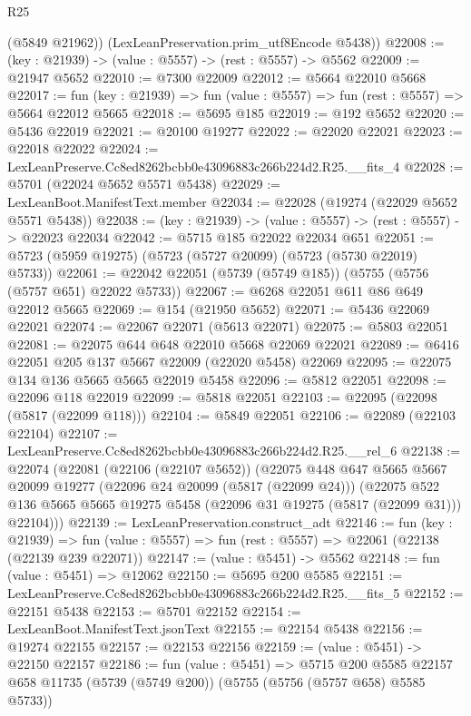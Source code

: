 \begin{lexlean}{R25}
\begin{coremodule}
        (@5849 @21962))
      (LexLeanPreservation.prim_utf8Encode @5438))
@22008 := (key : @21939) -> (value : @5557) -> (rest : @5557) -> @5562
@22009 := @21947 @5652
@22010 := @7300 @22009
@22012 := @5664 @22010 @5668
@22017 := fun (key : @21939) => fun (value : @5557) => fun (rest : @5557) => @5664 @22012 @5665
@22018 := @5695 @185
@22019 := @192 @5652
@22020 := @5436 @22019
@22021 := @20100 @19277
@22022 := @22020 @22021
@22023 := @22018 @22022
@22024 := LexLeanPreserve.Cc8ed8262bcbb0e43096883c266b224d2.R25.__fits_4
@22028 := @5701 (@22024 @5652 @5571 @5438)
@22029 := LexLeanBoot.ManifestText.member
@22034 := @22028 (@19274 (@22029 @5652 @5571 @5438))
@22038 := (key : @21939) -> (value : @5557) -> (rest : @5557) -> @22023 @22034
@22042 := @5715 @185 @22022 @22034 @651
@22051 := @5723 (@5959 @19275) (@5723 (@5727 @20099) (@5723 (@5730 @22019) @5733))
@22061 := @22042 @22051 (@5739 (@5749 @185)) (@5755 (@5756 (@5757 @651) @22022 @5733))
@22067 := @6268 @22051 @611 @86 @649 @22012 @5665
@22069 := @154 (@21950 @5652)
@22071 := @5436 @22069 @22021
@22074 := @22067 @22071 (@5613 @22071)
@22075 := @5803 @22051
@22081 := @22075 @644 @648 @22010 @5668 @22069 @22021
@22089 := @6416 @22051 @205 @137 @5667 @22009 (@22020 @5458) @22069
@22095 := @22075 @134 @136 @5665 @5665 @22019 @5458
@22096 := @5812 @22051
@22098 := @22096 @118 @22019
@22099 := @5818 @22051
@22103 := @22095 (@22098 (@5817 (@22099 @118)))
@22104 := @5849 @22051
@22106 := @22089 (@22103 @22104)
@22107 := LexLeanPreserve.Cc8ed8262bcbb0e43096883c266b224d2.R25.__rel_6
@22138 := @22074
    (@22081
      (@22106 (@22107 @5652))
      (@22075
        @448
        @647
        @5665
        @5667
        @20099
        @19277
        (@22096 @24 @20099 (@5817 (@22099 @24)))
        (@22075
          @522
          @136
          @5665
          @5665
          @19275
          @5458
          (@22096 @31 @19275 (@5817 (@22099 @31)))
          @22104)))
@22139 := LexLeanPreservation.construct_adt
@22146 := fun (key : @21939) =>
  fun (value : @5557) => fun (rest : @5557) => @22061 (@22138 (@22139 @239 @22071))
@22147 := (value : @5451) -> @5562
@22148 := fun (value : @5451) => @12062
@22150 := @5695 @200 @5585
@22151 := LexLeanPreserve.Cc8ed8262bcbb0e43096883c266b224d2.R25.__fits_5
@22152 := @22151 @5438
@22153 := @5701 @22152
@22154 := LexLeanBoot.ManifestText.jsonText
@22155 := @22154 @5438
@22156 := @19274 @22155
@22157 := @22153 @22156
@22159 := (value : @5451) -> @22150 @22157
@22186 := fun (value : @5451) =>
  @5715
    @200
    @5585
    @22157
    @658
    @11735
    (@5739 (@5749 @200))
    (@5755 (@5756 (@5757 @658) @5585 @5733))

\end{coremodule}
\end{lexlean}
